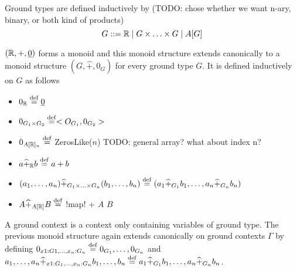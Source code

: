 Ground types are defined inductively by 
(TODO: chose whether we want n-ary, binary, or both kind of products)
$$G::= \mathbb{R} \mid G\times \ldots \times G \mid A[G]$$

$(\mathbb{R},+,\underline{0})$ forms a monoid and this monoid structure extends canonically 
to a monoid structure $(G,\widehat{+},0_G)$ for every ground type $G$. 
It is defined inductively on $G$ as follows
\begin{itemize}
    \item $0_{\mathbb{R}} \stackrel {\mathrm{def}}= \underline{0}$
    \item $0_{G_1\times G_2}\stackrel {\mathrm{def}}= < O_{G_1}, 0_{G_2} >$
    \item $0_{A[\mathbb{R}]_n}\stackrel {\mathrm{def}}=$ ZerosLike($n$) TODO: general array? what about index n?
    \item $a\widehat{+}_{\mathbb{R}} b\stackrel {\mathrm{def}}= a+b$
    \item $(a_1,\ldots,a_n)\widehat{+}_{G_1\times\ldots\times G_n}(b_1,\ldots,b_n)\stackrel {\mathrm{def}}= (a_1\widehat{+}_{G_1}b_1,\ldots,a_n\widehat{+}_{G_n}b_n)$
    \item $A\widehat{+}_{A[\mathbb{R}]}B \stackrel {\mathrm{def}}=$ !map! + $A$ $B$
\end{itemize}

A ground context is a context only containing variables of ground type.
The previous monoid structure again extends canonically on ground contexts $\Gamma$ by defining
$0_{x1:G1,\ldots,x_n:G_n}\stackrel {\mathrm{def}}= 0_{G_1},\ldots,0_{G_n}$ and 
$a_1,\ldots,a_n\widehat{+}_{x1:G_1,\ldots, x_n:G_n}b_1,\ldots,b_n\stackrel {\mathrm{def}}= a_1\widehat{+}_{G_1}b_1,\ldots,a_n\widehat{+}_{G_n}b_n$.


